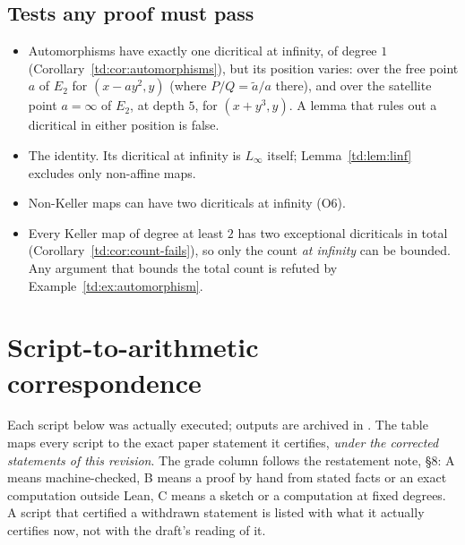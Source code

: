 \documentclass[a4paper,11pt]{article}
\newcommand{\filename}[1]{\texttt{\seqsplit{#1}}}
\theoremstyle{plain}
\theoremstyle{definition}
\theoremstyle{remark}
\begin{document}
\subsection{Tests any proof must pass}

\begin{itemize}[nosep]
\item[\textbf{T1.}] Automorphisms have exactly one dicritical at infinity, of degree $1$
(Corollary~\ref{td:cor:automorphisms}), but its position varies: over the free point $a$ of
$E_2$ for $(x - a y^2, y)$ (where $P/Q = \tilde{a}/a$ there), and over the satellite point
$a = \infty$ of $E_2$, at depth $5$, for $(x + y^3, y)$. A lemma that rules out a dicritical
in either position is false.
\item[\textbf{T2.}] The identity. Its dicritical at infinity is $L_\infty$ itself;
Lemma~\ref{td:lem:linf} excludes only non-affine maps.
\item[\textbf{T3.}] Non-Keller maps can have two dicriticals at infinity (O6).
\item[\textbf{T4.}] Every Keller map of degree at least $2$ has two exceptional dicriticals in
total (Corollary~\ref{td:cor:count-fails}), so only the count \emph{at infinity} can be
bounded. Any argument that bounds the total count is refuted by Example~\ref{td:ex:automorphism}.
\end{itemize}

\section{Script-to-arithmetic correspondence}\label{td:sec:correspondence}

Each script below was actually executed; outputs are archived in \filename{outputs/}. The
table maps every script to the exact paper statement it certifies, \emph{under the corrected
statements of this revision}. The grade column follows the restatement note, \S 8: A means
machine-checked, B means a proof by hand from stated facts or an exact computation outside
Lean, C means a sketch or a computation at fixed degrees. A script that certified a withdrawn
statement is listed with what it actually certifies now, not with the draft's reading of it.
\end{document}
